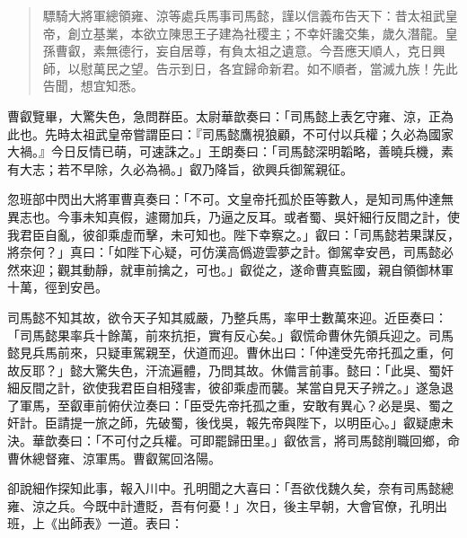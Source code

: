 \begin{quote}
驃騎大將軍總領雍、涼等處兵馬事司馬懿，謹以信義布告天下：昔太祖武皇帝，創立基業，本欲立陳思王子建為社稷主；不幸奸讒交集，歲久潛龍。皇孫曹叡，素無德行，妄自居尊，有負太祖之遺意。今吾應天順人，克日興師，以慰萬民之望。告示到日，各宜歸命新君。如不順者，當滅九族！先此告聞，想宜知悉。
\end{quote}

曹叡覽畢，大驚失色，急問群臣。太尉華歆奏曰：「司馬懿上表乞守雍、涼，正為此也。先時太祖武皇帝嘗謂臣曰：『司馬懿鷹視狼顧，不可付以兵權；久必為國家大禍。』今日反情已萌，可速誅之。」王朗奏曰：「司馬懿深明韜略，善曉兵機，素有大志；若不早除，久必為禍。」叡乃降旨，欲興兵御駕親征。

忽班部中閃出大將軍曹真奏曰：「不可。文皇帝托孤於臣等數人，是知司馬仲達無異志也。今事未知真假，遽爾加兵，乃逼之反耳。或者蜀、吳奸細行反間之計，使我君臣自亂，彼卻乘虛而擊，未可知也。陛下幸察之。」叡曰：「司馬懿若果謀反，將奈何？」真曰：「如陛下心疑，可仿漢高僞遊雲夢之計。御駕幸安邑，司馬懿必然來迎；觀其動靜，就車前擒之，可也。」叡從之，遂命曹真監國，親自領御林軍十萬，徑到安邑。

司馬懿不知其故，欲令天子知其威嚴，乃整兵馬，率甲士數萬來迎。近臣奏曰：「司馬懿果率兵十餘萬，前來抗拒，實有反心矣。」叡慌命曹休先領兵迎之。司馬懿見兵馬前來，只疑車駕親至，伏道而迎。曹休出曰：「仲達受先帝托孤之重，何故反耶？」懿大驚失色，汗流遍體，乃問其故。休備言前事。懿曰：「此吳、蜀奸細反間之計，欲使我君臣自相殘害，彼卻乘虛而襲。某當自見天子辨之。」遂急退了軍馬，至叡車前俯伏泣奏曰：「臣受先帝托孤之重，安敢有異心？必是吳、蜀之奸計。臣請提一旅之師，先破蜀，後伐吳，報先帝與陛下，以明臣心。」叡疑慮未決。華歆奏曰：「不可付之兵權。可即罷歸田里。」叡依言，將司馬懿削職回鄉，命曹休總督雍、涼軍馬。曹叡駕回洛陽。

卻說細作探知此事，報入川中。孔明聞之大喜曰：「吾欲伐魏久矣，奈有司馬懿總雍、涼之兵。今既中計遭貶，吾有何憂！」次日，後主早朝，大會官僚，孔明出班，上《出師表》一道。表曰：

